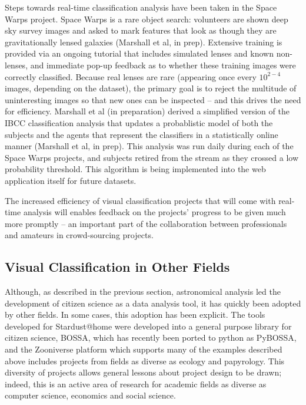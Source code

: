 \documentclass{ar2e}
\begin{document}
Steps towards real-time classification analysis have been taken in the Space
Warps project. Space Warps is a rare object search: volunteers are shown deep
sky survey images and asked to mark features that look as though they are
gravitationally lensed galaxies (Marshall et al, in prep). Extensive training is
provided via an ongoing tutorial that includes simulated lenses and known
non-lenses, and immediate pop-up feedback as to whether these training images
were correctly classified. Because real lenses are rare (appearing once every
$10^{2-4}$ images, depending on the dataset), the primary goal is to reject the
multitude of uninteresting images so that new ones can be inspected -- and this
drives the need for efficiency. Marshall et al (in preparation) derived a
simplified version of the IBCC classification analysis that updates a
probablistic model of both the subjects and the agents that represent the
classifiers in a statistically online manner (Marshall et al, in prep). This
analysis was run daily during each of the Space Warps projects, and subjects
retired from the stream as they crossed a low probability threshold. This
algorithm is being implemented into the web application itself for future
datasets. 

The increased  efficiency of visual classification projects that will come with
real-time analysis will enables feedback on the projects' progress to be given
much more promptly -- an important part of the collaboration between
professionals and amateurs in crowd-sourcing projects.



\subsection{Visual Classification in Other Fields}
\label{sec:class:non-astro}

Although, as described in the previous section, astronomical analysis led the
development of citizen science as a data analysis tool, it has quickly been
adopted by other fields. In some cases, this adoption has been explicit. The
tools developed for Stardust@home were developed into a general purpose
library for citizen science, BOSSA, which has recently been ported to python
as PyBOSSA, and the Zooniverse platform which supports many of the examples
described above includes projects from fields as diverse as ecology and
papyrology. This diversity of projects allows general lessons about project
design to be drawn; indeed, this is an active area of research for academic
fields as diverse as computer science, economics and social science. 
\end{document}
